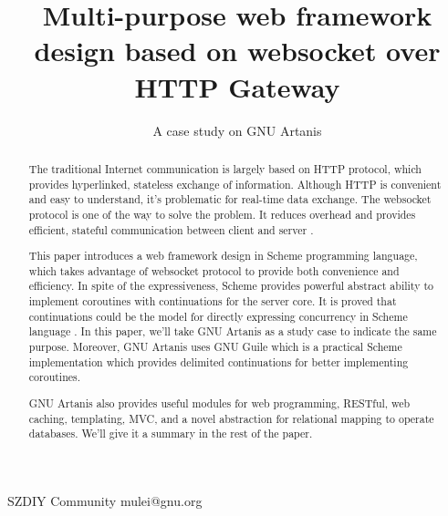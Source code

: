 \documentclass[preprint,numbers,numberedpars,10pt]{sigplanconf}
\begin{document}
\setlength{\pdfpageheight}{\paperheight}
\setlength{\pdfpagewidth}{\paperwidth}




\title{Multi-purpose web framework design based on websocket over HTTP Gateway}
\subtitle{A case study on GNU Artanis}

           {SZDIY Community}
           {mulei@gnu.org}

\maketitle

\begin{abstract}
  The traditional Internet communication is largely based on HTTP protocol, which provides hyperlinked, stateless exchange of information.
  Although HTTP is convenient and easy to understand, it's problematic for real-time data exchange. The websocket protocol is one of the way
  to solve the problem. It reduces overhead and provides efficient, stateful communication between client and server \citep{6197172}.
  
  This paper introduces a web framework design in Scheme programming language, which takes advantage of websocket protocol to provide both
  convenience and efficiency. In spite of the expressiveness, Scheme provides powerful abstract ability to implement coroutines with
  continuations for the server core.
  It is proved that continuations could be the model for directly expressing concurrency in Scheme language \citep{shivers1997continuations}.
  In this paper, we'll take GNU Artanis as a study case to indicate the same purpose. Moreover,
  GNU Artanis uses GNU Guile which is a practical Scheme implementation which provides delimited continuations for better implementing coroutines.

  GNU Artanis also provides useful modules for web programming, RESTful, web caching, templating, MVC, and a novel abstraction for relational
  mapping to operate databases. We'll give it a summary in the rest of the paper.
\end{abstract}
\end{document}
